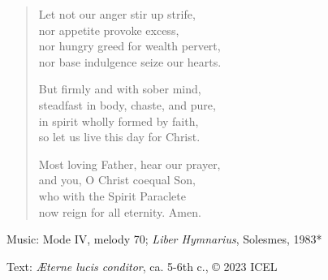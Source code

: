 \hymn



\setlength{\leftmargini}{2em}
\begin{verse}
  Let not our anger stir up strife,\\
  nor appetite provoke excess,\\
  nor hungry greed for wealth pervert,\\
  nor base indulgence seize our hearts.

  But firmly and with sober mind,\\
  steadfast in body, chaste, and pure,\\
  in spirit wholly formed by faith,\\
  so let us live this day for Christ.

  Most loving Father, hear our prayer,\\
  and you, O Christ coequal Son,\\
  who with the Spirit Paraclete\\
  now reign for all eternity. Amen.
      \end{verse}
  \setlength{\leftmargini}{\defleftmargini}

\begin{hymnsource}
Music: Mode IV, melody 70; \emph{Liber Hymnarius}, Solesmes, 1983*

Text: \emph{Æterne lucis conditor}, ca. 5-6th c., © 2023 ICEL
\end{hymnsource}

